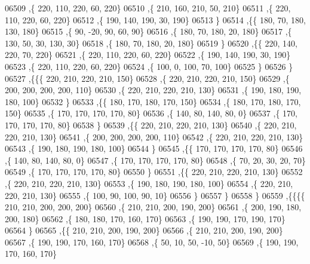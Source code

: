 \begin{DoxyCode}
06509     ,\{   220,   110,   220,    60,   220\}
06510     ,\{   210,   160,   210,    50,   210\}
06511     ,\{   220,   110,   220,    60,   220\}
06512     ,\{   190,   140,   190,    30,   190\}
06513     \}
06514    ,\{\{   180,    70,   180,   130,   180\}
06515     ,\{    90,   -20,    90,    60,    90\}
06516     ,\{   180,    70,   180,    20,   180\}
06517     ,\{   130,    50,    30,   130,    30\}
06518     ,\{   180,    70,   180,    20,   180\}
06519     \}
06520    ,\{\{   220,   140,   220,    70,   220\}
06521     ,\{   220,   110,   220,    60,   220\}
06522     ,\{   190,   140,   190,    30,   190\}
06523     ,\{   220,   110,   220,    60,   220\}
06524     ,\{   100,     0,   100,    70,   100\}
06525     \}
06526    \}
06527   ,\{\{\{   220,   210,   220,   210,   150\}
06528     ,\{   220,   210,   220,   210,   150\}
06529     ,\{   200,   200,   200,   200,   110\}
06530     ,\{   220,   210,   220,   210,   130\}
06531     ,\{   190,   180,   190,   180,   100\}
06532     \}
06533    ,\{\{   180,   170,   180,   170,   150\}
06534     ,\{   180,   170,   180,   170,   150\}
06535     ,\{   170,   170,   170,   170,    80\}
06536     ,\{   140,    80,   140,    80,     0\}
06537     ,\{   170,   170,   170,   170,    80\}
06538     \}
06539    ,\{\{   220,   210,   220,   210,   130\}
06540     ,\{   220,   210,   220,   210,   130\}
06541     ,\{   200,   200,   200,   200,   110\}
06542     ,\{   220,   210,   220,   210,   130\}
06543     ,\{   190,   180,   190,   180,   100\}
06544     \}
06545    ,\{\{   170,   170,   170,   170,    80\}
06546     ,\{   140,    80,   140,    80,     0\}
06547     ,\{   170,   170,   170,   170,    80\}
06548     ,\{    70,    20,    30,    20,    70\}
06549     ,\{   170,   170,   170,   170,    80\}
06550     \}
06551    ,\{\{   220,   210,   220,   210,   130\}
06552     ,\{   220,   210,   220,   210,   130\}
06553     ,\{   190,   180,   190,   180,   100\}
06554     ,\{   220,   210,   220,   210,   130\}
06555     ,\{   100,    90,   100,    90,    10\}
06556     \}
06557    \}
06558   \}
06559  ,\{\{\{\{   210,   210,   200,   200,   200\}
06560     ,\{   210,   210,   200,   190,   200\}
06561     ,\{   200,   190,   180,   200,   180\}
06562     ,\{   180,   180,   170,   160,   170\}
06563     ,\{   190,   190,   170,   190,   170\}
06564     \}
06565    ,\{\{   210,   210,   200,   190,   200\}
06566     ,\{   210,   210,   200,   190,   200\}
06567     ,\{   190,   190,   170,   160,   170\}
06568     ,\{    50,    10,    50,   -10,    50\}
06569     ,\{   190,   190,   170,   160,   170\}

\end{DoxyCode}
